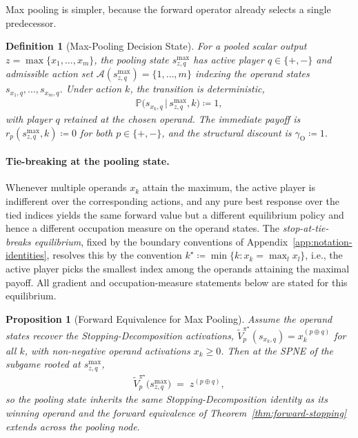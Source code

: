 \documentclass[twoside]{article}
\renewcommand{\P}{\mathbb{P}}
\newcommand{\1}{\mathbf{1}}
\newtheorem{proposition}{Proposition}
\newtheorem{definition}{Definition}
\begin{document}
Max pooling is simpler, because the forward operator already selects a single predecessor.

\begin{definition}[Max-Pooling Decision State]\label{def:maxpool-subgame}
For a pooled scalar output $z = \max\{x_1, \dots, x_m\}$, the \emph{pooling state} $s_{z,q}^{\max}$
has active player $q \in \{+, -\}$ and admissible action set $\mathcal{A}(s_{z,q}^{\max}) = \{1,
    \dots, m\}$ indexing the operand states $s_{x_1,q}, \dots, s_{x_m,q}$. Under action $k$, the
transition is deterministic,
\begin{align}
    \P\bigl(s_{x_k,q} \,\big|\, s_{z,q}^{\max}, k\bigr) \coloneqq 1,
\end{align}
with player $q$ retained at the chosen operand. The immediate payoff is $r_p(s_{z,q}^{\max}, k)
    \coloneqq 0$ for both $p \in \{+,-\}$, and the structural discount is $\gamma_{\mathrm{O}}
    \coloneqq 1$.
\end{definition}

\paragraph{Tie-breaking at the pooling state.}
Whenever multiple operands $x_k$ attain the maximum, the active player is indifferent over the
corresponding actions, and any pure best response over the tied indices yields the same forward
value but a different equilibrium policy and hence a different occupation measure on the operand
states. The \emph{stop-at-tie-breaks equilibrium}, fixed by the boundary conventions of
Appendix~\ref{app:notation-identities}, resolves this by the convention $k^\star \coloneqq \min\{k
    : x_k = \max_l x_l\}$, i.e., the active player picks the smallest index among the operands
attaining the maximal payoff. All gradient and occupation-measure statements below are stated for
this equilibrium.

\begin{proposition}[Forward Equivalence for Max Pooling]\label{prop:maxpool-equivalence}
Assume the operand states recover the Stopping-Decomposition activations, $\tilde
    V_p^{\pi^\star}(s_{x_k,q}) = x_k^{(p\oplus q)}$ for all $k$, with non-negative operand activations
$x_k \ge 0$. Then at the SPNE of the subgame rooted at $s_{z,q}^{\max}$,
\begin{align}
    \tilde V_p^{\pi^\star}\bigl(s_{z,q}^{\max}\bigr) \;=\; z^{(p\oplus q)},
\end{align}
so the pooling state inherits the same Stopping-Decomposition identity as its winning operand and
the forward equivalence of Theorem~\ref{thm:forward-stopping} extends across the pooling node.
\end{proposition}
\end{document}
